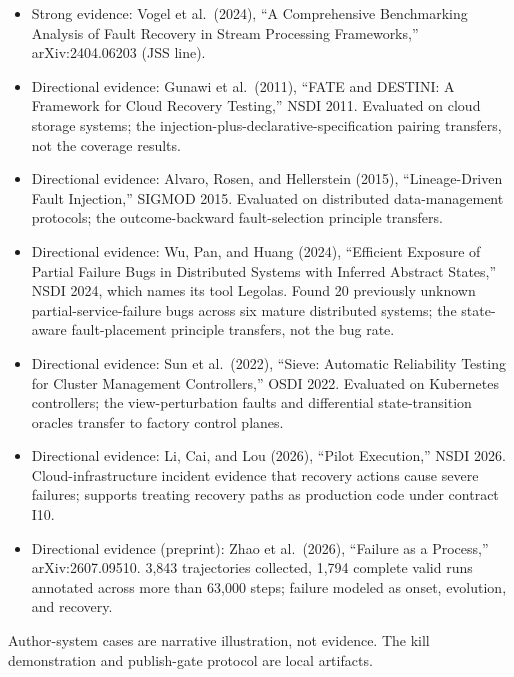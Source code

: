 \begin{itemize}
\tightlist
\item
  Strong evidence: Vogel et al.~(2024), ``A Comprehensive Benchmarking Analysis of Fault Recovery in Stream Processing Frameworks,'' arXiv:2404.06203 (JSS line).
\item
  Directional evidence: Gunawi et al.~(2011), ``FATE and DESTINI: A Framework for Cloud Recovery Testing,'' NSDI 2011. Evaluated on cloud storage systems; the injection-plus-declarative-specification pairing transfers, not the coverage results.
\item
  Directional evidence: Alvaro, Rosen, and Hellerstein (2015), ``Lineage-Driven Fault Injection,'' SIGMOD 2015. Evaluated on distributed data-management protocols; the outcome-backward fault-selection principle transfers.
\item
  Directional evidence: Wu, Pan, and Huang (2024), ``Efficient Exposure of Partial Failure Bugs in Distributed Systems with Inferred Abstract States,'' NSDI 2024, which names its tool Legolas. Found 20 previously unknown partial-service-failure bugs across six mature distributed systems; the state-aware fault-placement principle transfers, not the bug rate.
\item
  Directional evidence: Sun et al.~(2022), ``Sieve: Automatic Reliability Testing for Cluster Management Controllers,'' OSDI 2022. Evaluated on Kubernetes controllers; the view-perturbation faults and differential state-transition oracles transfer to factory control planes.
\item
  Directional evidence: Li, Cai, and Lou (2026), ``Pilot Execution,'' NSDI 2026. Cloud-infrastructure incident evidence that recovery actions cause severe failures; supports treating recovery paths as production code under contract I10.
\item
  Directional evidence (preprint): Zhao et al.~(2026), ``Failure as a Process,'' arXiv:2607.09510. 3,843 trajectories collected, 1,794 complete valid runs annotated across more than 63,000 steps; failure modeled as onset, evolution, and recovery.
\end{itemize}

Author-system cases are narrative illustration, not evidence. The kill demonstration and publish-gate protocol are local artifacts.
